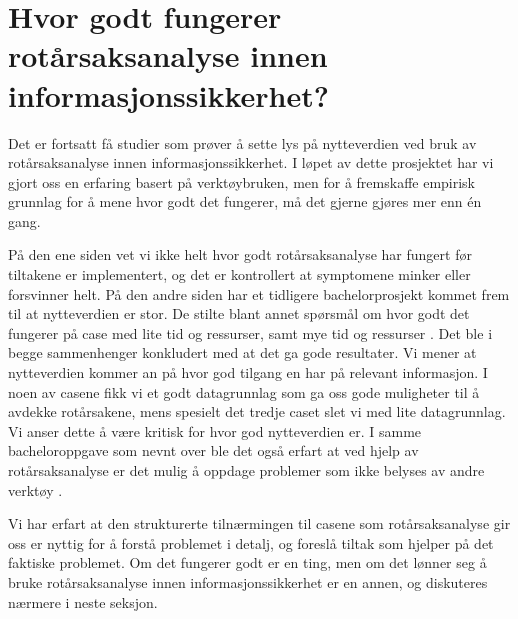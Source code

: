 \section{Hvor godt fungerer rotårsaksanalyse innen informasjonssikkerhet?}
Det er fortsatt få studier som prøver å sette lys på nytteverdien ved bruk av rotårsaksanalyse innen informasjonssikkerhet. I løpet av dette prosjektet har vi gjort oss en erfaring basert på verktøybruken, men for å fremskaffe empirisk grunnlag for å mene hvor godt det fungerer, må det gjerne gjøres mer enn én gang. 

På den ene siden vet vi ikke helt hvor godt rotårsaksanalyse har fungert før tiltakene er implementert, og det er kontrollert at symptomene minker eller forsvinner helt. På den andre siden har et tidligere bachelorprosjekt kommet frem til at nytteverdien er stor. De stilte blant annet spørsmål om hvor godt det fungerer på case med lite tid og ressurser, samt mye tid og ressurser \cite{RCARapport}. Det ble i begge sammenhenger konkludert med at det ga gode resultater. Vi mener at nytteverdien kommer an på hvor god tilgang en har på relevant informasjon. I noen av casene fikk vi et godt datagrunnlag som ga oss gode muligheter til å avdekke rotårsakene, mens spesielt det tredje caset slet vi med lite datagrunnlag. Vi anser dette å være kritisk for hvor god nytteverdien er. I samme bacheloroppgave som nevnt over ble det også erfart at ved hjelp av rotårsaksanalyse er det mulig å oppdage problemer som ikke belyses av andre verktøy \cite{RCARapport}.

Vi har erfart at den strukturerte tilnærmingen til casene som rotårsaksanalyse gir oss er nyttig for å forstå problemet i detalj, og foreslå tiltak som hjelper på det faktiske problemet. Om det fungerer godt er en ting, men om det lønner seg å bruke rotårsaksanalyse innen informasjonssikkerhet er en annen, og diskuteres nærmere i neste seksjon. 


